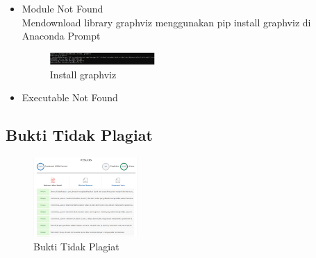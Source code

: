 \begin{enumerate}
\begin{itemize}
	\item Module Not Found\\
	Mendownload library graphviz menggunakan pip install graphviz di Anaconda Prompt
	\begin{figure}[H]
		\includegraphics[width=4cm]{figures/1174086/2/error/solusi2.PNG}
		\centering
		\caption{Install graphviz}
	\end{figure}
	
	\item Executable Not Found
	
	\end{itemize}
\end{enumerate}


\subsection{Bukti Tidak Plagiat}
\begin{figure}[H]
	\includegraphics[width=4cm]{figures/1174086/2/plagiarisme.PNG}
	\centering
	\caption{Bukti Tidak Plagiat}
\end{figure}